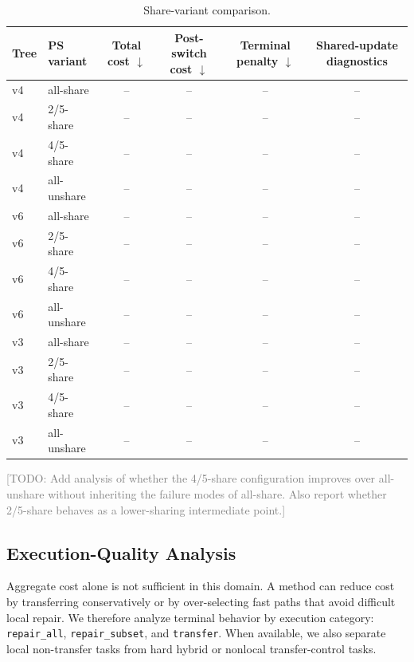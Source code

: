 \begin{table}[t]
    \centering
    \small
    \caption{Share-variant comparison.}
    \label{tab:share_variant_results}
    \begin{tabular}{llcccc}
        \toprule
        Tree & PS variant & Total cost $\downarrow$ & Post-switch cost $\downarrow$ & Terminal penalty $\downarrow$ & Shared-update diagnostics \\
        \midrule
        v4 & all-share & -- & -- & -- & -- \\
        v4 & 2/5-share & -- & -- & -- & -- \\
        v4 & 4/5-share & -- & -- & -- & -- \\
        v4 & all-unshare & -- & -- & -- & -- \\
        v6 & all-share & -- & -- & -- & -- \\
        v6 & 2/5-share & -- & -- & -- & -- \\
        v6 & 4/5-share & -- & -- & -- & -- \\
        v6 & all-unshare & -- & -- & -- & -- \\
        v3 & all-share & -- & -- & -- & -- \\
        v3 & 2/5-share & -- & -- & -- & -- \\
        v3 & 4/5-share & -- & -- & -- & -- \\
        v3 & all-unshare & -- & -- & -- & -- \\
        \bottomrule
    \end{tabular}
\end{table}

\textcolor{gray}{[TODO: Add analysis of whether the 4/5-share configuration improves over all-unshare without inheriting the failure modes of all-share. Also report whether 2/5-share behaves as a lower-sharing intermediate point.]}

\subsection{Execution-Quality Analysis}
\label{sec:exp_execution_quality}

Aggregate cost alone is not sufficient in this domain. A method can reduce cost by transferring conservatively or by over-selecting fast paths that avoid difficult local repair. We therefore analyze terminal behavior by execution category:
\texttt{repair\_all},
\texttt{repair\_subset},
and \texttt{transfer}. When available, we also separate local non-transfer tasks from hard hybrid or nonlocal transfer-control tasks.

